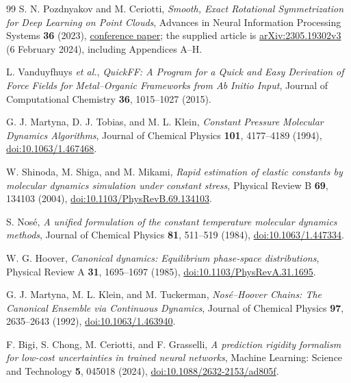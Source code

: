 \documentclass[12pt,a4paper]{article}
\numberwithin{equation}{section}
\begin{document}
\begin{thebibliography}{99}
S. N. Pozdnyakov and M. Ceriotti,
\emph{Smooth, Exact Rotational Symmetrization for Deep Learning on Point
Clouds}, Advances in Neural Information Processing Systems \textbf{36}
(2023),
\href{https://proceedings.neurips.cc/paper_files/paper/2023/hash/fb4a7e3522363907b26a86cc5be627ac-Abstract-Conference.html}{conference paper};
the supplied article is
\href{https://arxiv.org/abs/2305.19302v3}{arXiv:2305.19302v3}
(6 February 2024), including Appendices A--H.

L. Vanduyfhuys \emph{et al.},
\emph{QuickFF: A Program for a Quick and Easy Derivation of Force Fields for
Metal--Organic Frameworks from Ab Initio Input}, Journal of Computational
Chemistry \textbf{36}, 1015--1027 (2015).

G. J. Martyna, D. J. Tobias, and M. L. Klein,
\emph{Constant Pressure Molecular Dynamics Algorithms}, Journal of Chemical
Physics \textbf{101}, 4177--4189 (1994),
\href{https://doi.org/10.1063/1.467468}{doi:10.1063/1.467468}.

W. Shinoda, M. Shiga, and M. Mikami,
\emph{Rapid estimation of elastic constants by molecular dynamics simulation
under constant stress}, Physical Review B \textbf{69}, 134103 (2004),
\href{https://doi.org/10.1103/PhysRevB.69.134103}{doi:10.1103/PhysRevB.69.134103}.

S. Nos\'e,
\emph{A unified formulation of the constant temperature molecular dynamics
methods}, Journal of Chemical Physics \textbf{81}, 511--519 (1984),
\href{https://doi.org/10.1063/1.447334}{doi:10.1063/1.447334}.

W. G. Hoover,
\emph{Canonical dynamics: Equilibrium phase-space distributions},
Physical Review A \textbf{31}, 1695--1697 (1985),
\href{https://doi.org/10.1103/PhysRevA.31.1695}{doi:10.1103/PhysRevA.31.1695}.

G. J. Martyna, M. L. Klein, and M. Tuckerman,
\emph{Nos\'e--Hoover Chains: The Canonical Ensemble via Continuous Dynamics},
Journal of Chemical Physics \textbf{97}, 2635--2643 (1992),
\href{https://doi.org/10.1063/1.463940}{doi:10.1063/1.463940}.

F. Bigi, S. Chong, M. Ceriotti, and F. Grasselli,
\emph{A prediction rigidity formalism for low-cost uncertainties in trained
neural networks}, Machine Learning: Science and Technology \textbf{5}, 045018
(2024),
\href{https://doi.org/10.1088/2632-2153/ad805f}{doi:10.1088/2632-2153/ad805f}.


\end{thebibliography}
\end{document}
